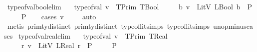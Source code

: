 \begin{isabellebody}
\endisatagproof
{\isafoldproof}%
%
\isadelimproof
\isanewline
%
\endisadelimproof
\isanewline
{}\isamarkupfalse%
\ type{\isacharunderscore}{\kern0pt}of{\isacharunderscore}{\kern0pt}val{\isacharunderscore}{\kern0pt}bool{\isacharunderscore}{\kern0pt}elim{\isacharcolon}{\kern0pt}\isanewline
\ \ {\isachardoublequoteopen}{\isasymlbrakk}\ type{\isacharunderscore}{\kern0pt}of{\isacharunderscore}{\kern0pt}val\ v\ {\isacharequal}{\kern0pt}\ TPrim\ TBool{\isacharsemicolon}{\kern0pt}\isanewline
\ \ \ \ \ {\isasymAnd}b{\isachardot}{\kern0pt}\ v\ {\isacharequal}{\kern0pt}\ LitV\ {\isacharparenleft}{\kern0pt}LBool\ b{\isacharparenright}{\kern0pt}\ {\isasymLongrightarrow}\ P\isanewline
\ \ \ {\isasymrbrakk}\ {\isasymLongrightarrow}\ P{\isachardoublequoteclose}\isanewline
%
\isadelimproof
\ \ %
\endisadelimproof
%
\isatagproof
{}\isamarkupfalse%
\ {\isacharparenleft}{\kern0pt}cases\ v{\isacharparenright}{\kern0pt}\isanewline
\ \ \ \isamarkupfalse%
\ auto{\isacharbrackleft}{\kern0pt}{}{\isacharbrackright}{\kern0pt}\isanewline
\ \ \isamarkupfalse%
\ {\isacharparenleft}{\kern0pt}metis\ prim{\isacharunderscore}{\kern0pt}ty{\isachardot}{\kern0pt}distinct{\isacharparenleft}{\kern0pt}{}{\isacharparenright}{\kern0pt}\ prim{\isacharunderscore}{\kern0pt}ty{\isachardot}{\kern0pt}distinct{\isacharparenleft}{\kern0pt}{}{\isacharparenright}{\kern0pt}\ type{\isacharunderscore}{\kern0pt}of{\isacharunderscore}{\kern0pt}lit{\isachardot}{\kern0pt}simps{\isacharparenleft}{\kern0pt}{}{\isacharparenright}{\kern0pt}\ type{\isacharunderscore}{\kern0pt}of{\isacharunderscore}{\kern0pt}lit{\isachardot}{\kern0pt}simps{\isacharparenleft}{\kern0pt}{}{\isacharparenright}{\kern0pt}\ unop{\isacharunderscore}{\kern0pt}minus{\isachardot}{\kern0pt}cases{\isacharparenright}{\kern0pt}%
\endisatagproof
{\isafoldproof}%
%
\isadelimproof
\isanewline
%
\endisadelimproof
\isanewline
{}\isamarkupfalse%
\ type{\isacharunderscore}{\kern0pt}of{\isacharunderscore}{\kern0pt}val{\isacharunderscore}{\kern0pt}real{\isacharunderscore}{\kern0pt}elim{\isacharcolon}{\kern0pt}\isanewline
\ \ {\isachardoublequoteopen}{\isasymlbrakk}\ type{\isacharunderscore}{\kern0pt}of{\isacharunderscore}{\kern0pt}val\ v\ {\isacharequal}{\kern0pt}\ TPrim\ TReal{\isacharsemicolon}{\kern0pt}\isanewline
\ \ \ \ \ {\isasymAnd}r{\isachardot}{\kern0pt}\ v\ {\isacharequal}{\kern0pt}\ LitV\ {\isacharparenleft}{\kern0pt}LReal\ r{\isacharparenright}{\kern0pt}\ {\isasymLongrightarrow}\ P\isanewline
\ \ \ {\isasymrbrakk}\ {\isasymLongrightarrow}\ P{\isachardoublequoteclose}\isanewline

\end{isabellebody}
